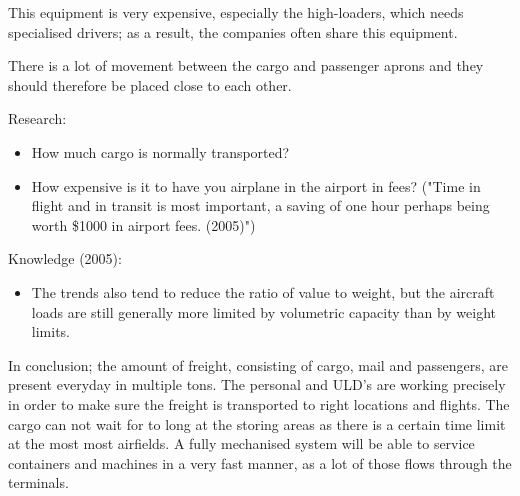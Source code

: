 This equipment is very expensive, especially the high-loaders, which needs specialised drivers; as a result, the companies often share this equipment.

There is a lot of movement between the cargo and passenger aprons and they should therefore be placed close to each other.

Research:
\begin{itemize}
\item How much cargo is normally transported?
\item How expensive is it to have you airplane in the airport in fees? ("Time in flight and in transit is most important, a saving of one hour perhaps being worth \$1000 in airport fees. (2005)")
\end{itemize}


Knowledge (2005):
\begin{itemize}
\item The trends also tend to reduce the ratio of value to weight, but the aircraft loads are still generally more limited by volumetric capacity than by weight limits.
\end{itemize}

In conclusion; the amount of freight, consisting of cargo, mail and passengers, are present everyday in multiple tons. The personal and ULD's are working precisely  in order to make sure the freight is transported to right locations and flights. The cargo can not wait for to long at the storing areas as there is a certain time limit at the most most airfields. A fully mechanised system will be able to service containers and machines in a very fast manner, as a lot of those flows through the terminals.